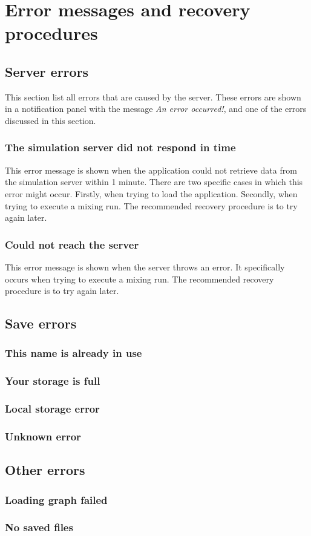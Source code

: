 \chapter{Error messages and recovery procedures}

\section {Server errors}
This section list all errors that are caused by the server. These errors are shown in a notification panel with the message \emph{An error occurred!}, and one of the errors discussed in this section.

\subsection{The simulation server did not respond in time}
This error message is shown when the application could not retrieve data from the simulation server within 1 minute. There are two specific cases in which this error might occur. Firstly, when trying to load the application. Secondly, when trying to execute a mixing run. The recommended recovery procedure is to try again later.

\subsection{Could not reach the server}
This error message is shown when the server throws an error. It specifically occurs when trying to execute a mixing run. The recommended recovery procedure is to try again later.

\section{Save errors}

\subsection{This name is already in use}

\subsection{Your storage is full}

\subsection{Local storage error}

\subsection{Unknown error}

\section{Other errors}

\subsection{Loading graph failed}

\subsection{No saved files}


